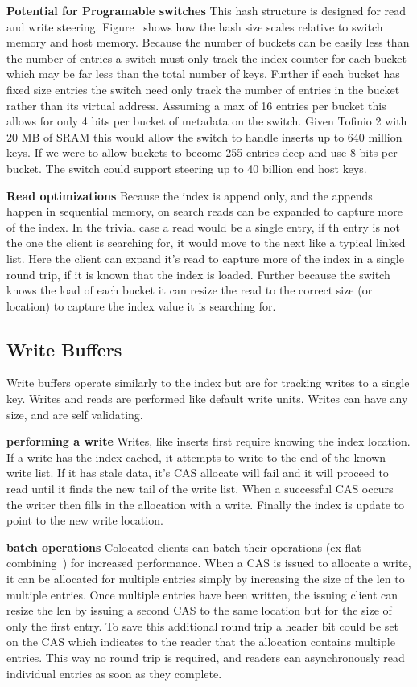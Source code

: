 \textbf{Potential for Programable switches} This hash structure is designed for
read and write steering. Figure~\cite{fig:Index} shows how the hash size scales
relative to switch memory and host memory. Because the number of buckets can be
easily less than the number of entries a switch must only track the index
counter for each bucket which may be far less than the total number of keys.
Further if each bucket has fixed size entries the switch need only track the
number of entries in the bucket rather than its virtual address. Assuming a max
of 16 entries per bucket this allows for only 4 bits per bucket of metadata on
the switch. Given Tofinio 2 with 20 MB of SRAM this would allow the switch to
handle inserts up to 640 million keys. If we were to allow buckets to become 255
entries deep and use 8 bits per bucket. The switch could support steering up to
40 billion end host keys.

\textbf{Read optimizations} Because the index is append only, and the appends
happen in sequential memory, on search reads can be expanded to capture more of
the index. In the trivial case a read would be a single entry, if th entry is
not the one the client is searching for, it would move to the next like a
typical linked list. Here the client can expand it's read to capture more of the
index in a single round trip, if it is known that the index is loaded. Further
because the switch knows the load of each bucket it can resize the read to the
correct size (or location) to capture the index value it is searching for.

\subsection{Write Buffers} 

Write buffers operate similarly to the index but are for tracking writes to a
single key. Writes and reads are performed like default write units. Writes can
have any size, and are self validating.

\textbf{performing a write} Writes, like inserts first require knowing the index
location. If a write has the index cached, it attempts to write to the end of
the known write list. If it has stale data, it's CAS allocate will fail and it
will proceed to read until it finds the new tail of the write list. When a
successful CAS occurs the writer then fills in the allocation with a write.
Finally the index is update to point to the new write location.

\textbf{batch operations} Colocated clients can batch their operations (ex flat
combining~\cite{flat-combine}) for increased performance. When a CAS is issued
to allocate a write, it can be allocated for multiple entries simply by
increasing the size of the len to multiple entries. Once multiple entries have
been written, the issuing client can resize the len by issuing a second CAS to
the same location but for the size of only the first entry. To save this
additional round trip a header bit could be set on the CAS which indicates to
the reader that the allocation contains multiple entries. This way no round trip
is required, and readers can asynchronously read individual entries as soon as
they complete.

